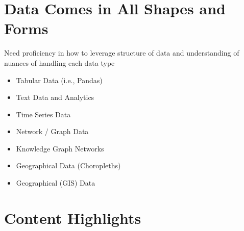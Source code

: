 \documentclass[11pt]{article}
\theoremstyle{definition}
\begin{document}
\section{Data Comes in All Shapes and Forms}
Need proficiency in how to leverage structure of data and understanding of nuances of handling each data type
\begin{itemize}
    \item Tabular Data (i.e., Pandas)
    \item Text Data and Analytics
    \item Time Series Data
    \item Network / Graph Data
    \item Knowledge Graph Networks
    \item Geographical Data (Choropleths)
    \item Geographical (GIS) Data
\end{itemize}

\section{Content Highlights}
\end{document}
